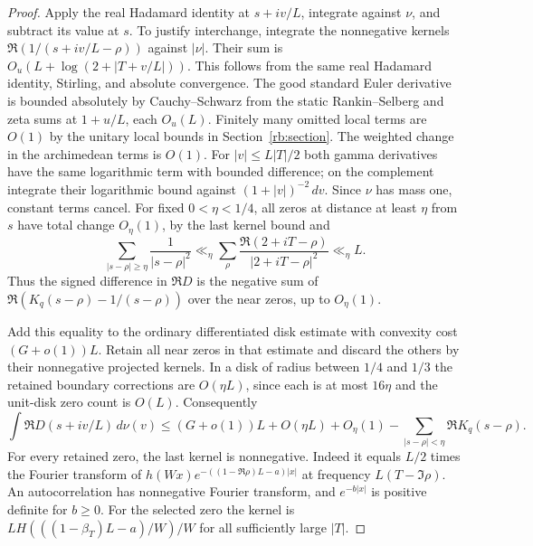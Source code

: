 \documentclass[11pt]{article}
\begin{document}
\begin{proof}
Apply the real Hadamard identity at $s+iv/L$, integrate against $\nu$, and subtract its value at $s$. To justify interchange, integrate the nonnegative kernels $\Re(1/(s+iv/L-\rho))$ against $|\nu|$. Their sum is $O_u(L+\log(2+|T+v/L|))$. This follows from the same real Hadamard identity, Stirling, and absolute convergence. The good standard Euler derivative is bounded absolutely by Cauchy--Schwarz from the static Rankin--Selberg and zeta sums at $1+u/L$, each $O_u(L)$. Finitely many omitted local terms are $O(1)$ by the unitary local bounds in Section~\ref{rb:section}. The weighted change in the archimedean terms is $O(1)$. For $|v|\le L|T|/2$ both gamma derivatives have the same logarithmic term with bounded difference; on the complement integrate their logarithmic bound against $(1+|v|)^{-2}\,dv$. Since $\nu$ has mass one, constant terms cancel. For fixed $0<\eta<1/4$, all zeros at distance at least $\eta$ from $s$ have total change $O_\eta(1)$, by the last kernel bound and
\[
  \sum_{|s-\rho|\ge\eta}\frac1{|s-\rho|^2}
  \ll_\eta \sum_{\rho}\frac{\Re(2+iT-\rho)}{|2+iT-\rho|^2}
  \ll_\eta L .
\]
Thus the signed difference in $\Re D$ is the negative sum of $\Re(K_q(s-\rho)-1/(s-\rho))$ over the near zeros, up to $O_\eta(1)$.

Add this equality to the ordinary differentiated disk estimate with convexity cost $(G+o(1))L$. Retain all near zeros in that estimate and discard the others by their nonnegative projected kernels. In a disk of radius between $1/4$ and $1/3$ the retained boundary corrections are $O(\eta L)$, since each is at most $16\eta$ and the unit-disk zero count is $O(L)$. Consequently
\[
 \int \Re D(s+iv/L)\,d\nu(v)
 \le (G+o(1))L+O(\eta L)+O_\eta(1)
      -\sum_{|s-\rho|<\eta}\Re K_q(s-\rho).
\]
For every retained zero, the last kernel is nonnegative. Indeed it equals $L/2$ times the Fourier transform of
$h(Wx)e^{-((1-\Re\rho)L-a)|x|}$ at frequency $L(T-\Im\rho)$. An autocorrelation has nonnegative Fourier transform, and $e^{-b|x|}$ is positive definite for $b\ge0$. For the selected zero the kernel is $LH(((1-\beta_T)L-a)/W)/W$ for all sufficiently large $|T|$.


\end{proof}
\end{document}
